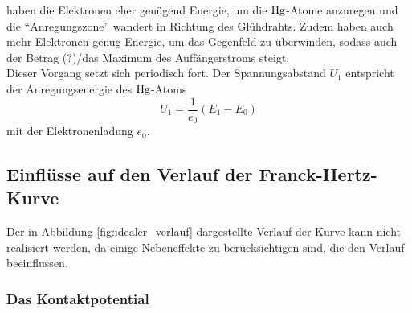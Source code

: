     haben die Elektronen eher genügend Energie,
    um die $\ce{Hg}$-Atome anzuregen und die \enquote{Anregungszone} wandert in Richtung des Glühdrahts.
    Zudem haben auch mehr Elektronen genug Energie,
    um das Gegenfeld zu überwinden,
    sodass auch der Betrag (?)/das Maximum des Auffängerstroms steigt.\\
    Dieser Vorgang setzt sich periodisch fort.
    Der Spannungsabstand $U_1$ entspricht der Anregungsenergie des $\ce{Hg}$-Atoms
    \begin{equation*}
        U_1 = \frac{1}{e_0} (E_1 - E_0)
    \end{equation*}
    mit der Elektronenladung $e_0$.

\subsection{Einflüsse auf den Verlauf der Franck-Hertz-Kurve}
\label{sec:einflüsse}

    Der in Abbildung \ref{fig:idealer_verlauf} dargestellte Verlauf der Kurve kann nicht realisiert werden,
    da einige Nebeneffekte zu berücksichtigen sind, 
    die den Verlauf beeinflussen.

\subsubsection{Das Kontaktpotential}
\label{sec:kontaktpotential}

